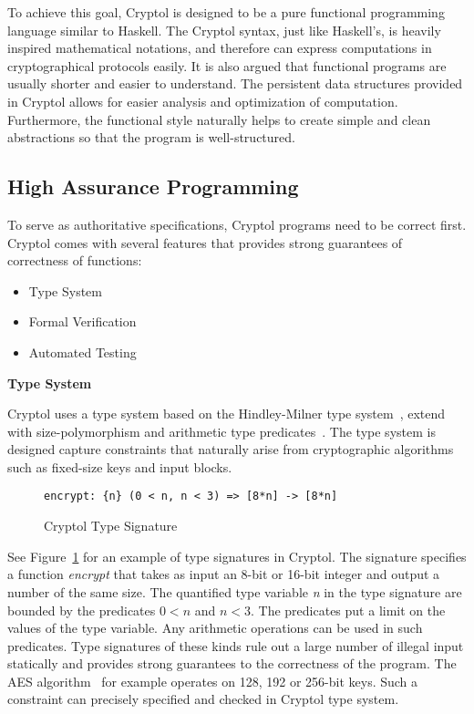 \documentclass[a4paper, notitlepage]{report}
\renewcommand{\paragraph}[1]{\vspace*{1em}\noindent\textbf{#1}\hspace*{1em}}
\begin{document}
To achieve this goal, Cryptol is designed to be a pure functional programming
language similar to Haskell. The Cryptol syntax, just like Haskell's, is
heavily inspired mathematical notations, and therefore can express computations
in cryptographical protocols easily.
It is also argued that functional programs
are usually shorter and easier to understand.
The persistent data structures provided in Cryptol
allows for easier analysis and optimization of computation. Furthermore,
the functional style naturally helps to create simple and clean abstractions so
that the program is well-structured. 

\subsection{High Assurance Programming}

To serve as authoritative specifications, Cryptol programs need
to be correct first. Cryptol comes with several features that provides strong
guarantees of correctness of functions:
\begin{itemize}
\item Type System
\item Formal Verification 
\item Automated Testing
\end{itemize}

\paragraph{Type System}

Cryptol uses a type system based on the Hindley-Milner
type system~\cite{hindley1969principal}, extend with size-polymorphism
and arithmetic type predicates~\cite{lewis2003cryptol}. The type system
is designed capture constraints that naturally arise from cryptographic
algorithms such as fixed-size keys and input blocks.

\begin{figure}
\begin{lstlisting}[frame=single]
encrypt: {n} (0 < n, n < 3) => [8*n] -> [8*n]
\end{lstlisting}
\caption{Cryptol Type Signature}
\label{fig:type}
\end{figure}

See Figure~\ref{fig:type} for an example of type signatures in Cryptol.
The signature specifies a function \emph{encrypt} that takes as input
an 8-bit or 16-bit integer and output a number of the same size.
The quantified type variable \emph{n} in the type signature are bounded
by the predicates $ 0 < n$ and $n < 3$. The predicates put a limit on the
values of the type variable. Any arithmetic operations can be used in
such predicates.
Type signatures of these kinds rule out a large number of illegal input
statically and provides strong guarantees to the correctness of the program.
The AES algorithm~\cite{standard2001announcing} for example operates on 128, 192
or 256-bit keys. Such a constraint can precisely specified and checked in
Cryptol type system.
\end{document}
